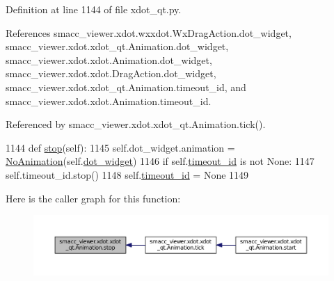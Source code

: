 Definition at line 1144 of file xdot\+\_\+qt.\+py.



References smacc\+\_\+viewer.\+xdot.\+wxxdot.\+Wx\+Drag\+Action.\+dot\+\_\+widget, smacc\+\_\+viewer.\+xdot.\+xdot\+\_\+qt.\+Animation.\+dot\+\_\+widget, smacc\+\_\+viewer.\+xdot.\+xdot.\+Animation.\+dot\+\_\+widget, smacc\+\_\+viewer.\+xdot.\+xdot.\+Drag\+Action.\+dot\+\_\+widget, smacc\+\_\+viewer.\+xdot.\+xdot\+\_\+qt.\+Animation.\+timeout\+\_\+id, and smacc\+\_\+viewer.\+xdot.\+xdot.\+Animation.\+timeout\+\_\+id.



Referenced by smacc\+\_\+viewer.\+xdot.\+xdot\+\_\+qt.\+Animation.\+tick().


\begin{DoxyCode}
1144     \textcolor{keyword}{def }\hyperlink{classsmacc__viewer_1_1xdot_1_1xdot__qt_1_1Animation_a2dcd0c6cbcae7adc73fad78fd3f09e21}{stop}(self):
1145         self.dot\_widget.animation = \hyperlink{classsmacc__viewer_1_1xdot_1_1xdot__qt_1_1NoAnimation}{NoAnimation}(self.\hyperlink{classsmacc__viewer_1_1xdot_1_1xdot__qt_1_1Animation_a8343fc754289769e4199933a2ef8b6c2}{dot\_widget})
1146         \textcolor{keywordflow}{if} self.\hyperlink{classsmacc__viewer_1_1xdot_1_1xdot__qt_1_1Animation_a9008b50eeabf48c6cea1ae475ea37d7f}{timeout\_id} \textcolor{keywordflow}{is} \textcolor{keywordflow}{not} \textcolor{keywordtype}{None}:
1147             self.timeout\_id.stop()
1148             self.\hyperlink{classsmacc__viewer_1_1xdot_1_1xdot__qt_1_1Animation_a9008b50eeabf48c6cea1ae475ea37d7f}{timeout\_id} = \textcolor{keywordtype}{None}
1149 
\end{DoxyCode}


Here is the caller graph for this function\+:
\nopagebreak
\begin{figure}[H]
\begin{center}
\leavevmode
\includegraphics[width=350pt]{classsmacc__viewer_1_1xdot_1_1xdot__qt_1_1Animation_a2dcd0c6cbcae7adc73fad78fd3f09e21_icgraph}
\end{center}
\end{figure}


